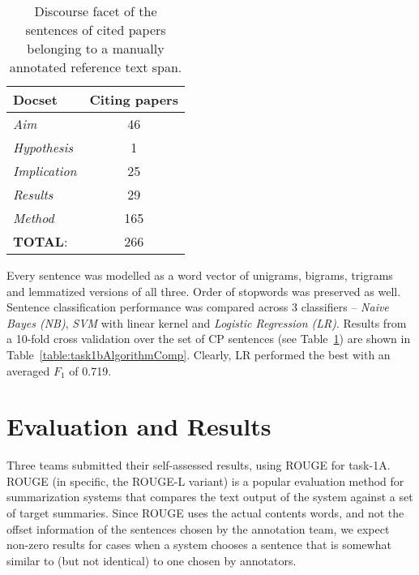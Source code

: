 \documentclass[11pt]{article}
\begin{document}
\begin{table}[h]\footnotesize
  \begin{center}
  \begin{tabular}{ |l | c |}
    \hline
    Docset & Citing papers \\ \hline
    \textit{Aim} & 46 \\ \hline
    \textit{Hypothesis} & 1 \\ \hline
    \textit{Implication} & 25 \\ \hline
    \textit{Results} & 29 \\ \hline
    \textit{Method} & 165 \\ \hline
    \textbf{TOTAL}: & 266 \\ \hline
    \hline
  \end{tabular}
  \caption{Discourse facet of the sentences of cited papers belonging to a manually annotated reference text span.}
  \label{table:task1bSentDistrib}
  \end{center}
\end{table}

Every sentence was modelled as a word vector of unigrams, 
bigrams, trigrams and lemmatized versions of all three.
Order of stopwords was preserved as well.
Sentence classification performance was 
compared across 3 classifiers -- \textit{Naive Bayes (NB)}, \textit{SVM} with linear kernel 
and \textit{Logistic Regression (LR)}. Results from a 10-fold cross validation over the 
set of CP sentences (see Table~\ref{table:task1bSentDistrib}) are shown in Table~\ref{table:task1bAlgorithmComp}. 
Clearly, LR performed the best with an averaged $F_1$ of 0.719.

\section{Evaluation and Results}
Three teams submitted their self-assessed results, using ROUGE \cite{Lin:2004} 
for task-1A. ROUGE (in specific, the ROUGE-L variant) is a popular evaluation 
method for summarization systems that compares the text output of the system 
against a set of target summaries. Since ROUGE uses the actual contents words,
 and not the offset information of the sentences chosen by the annotation team, 
 we expect non-zero results for cases when a system chooses a sentence that is 
 somewhat similar to (but not identical) to one chosen by annotators.
\end{document}
